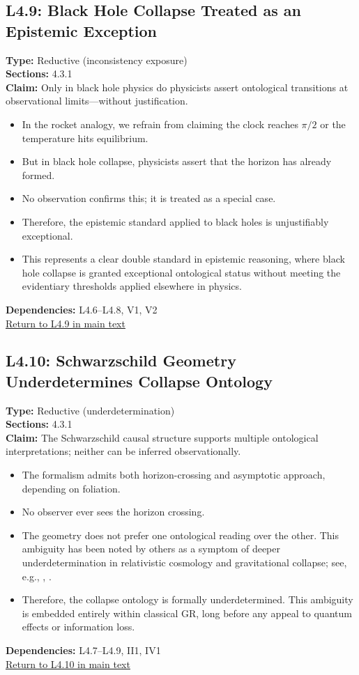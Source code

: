 \documentclass[12pt]{book}
\newcommand{\returnlink}[1]{\hyperref[logic:#1]{Return to #1 in main text}\xspace}
\begin{document}
\subsection*{L4.9: Black Hole Collapse Treated as an Epistemic Exception}\label{appendix:L4.9}
\textbf{Type:} Reductive (inconsistency exposure) \\
\textbf{Sections:} 4.3.1 \\
\textbf{Claim:} Only in black hole physics do physicists assert ontological transitions at observational limits---without justification.
\begin{itemize}
  \item In the rocket analogy, we refrain from claiming the clock reaches \( \pi/2 \) or the temperature hits equilibrium.
  \item But in black hole collapse, physicists assert that the horizon has already formed.
  \item No observation confirms this; it is treated as a special case.
  \item Therefore, the epistemic standard applied to black holes is unjustifiably exceptional.
  \item This represents a clear double standard in epistemic reasoning, where black hole collapse is granted exceptional ontological status without meeting the evidentiary thresholds applied elsewhere in physics.
\end{itemize}
\textbf{Dependencies:} L4.6–L4.8, V1, V2 \\
\returnlink{L4.9}

\subsection*{L4.10: Schwarzschild Geometry Underdetermines Collapse Ontology}\label{appendix:L4.10}
\textbf{Type:} Reductive (underdetermination) \\
\textbf{Sections:} 4.3.1 \\
\textbf{Claim:} The Schwarzschild causal structure supports multiple ontological interpretations; neither can be inferred observationally.
\begin{itemize}
  \item The formalism admits both horizon-crossing and asymptotic approach, depending on foliation.
  \item No observer ever sees the horizon crossing.
  \item The geometry does not prefer one ontological reading over the other. This ambiguity has been noted by others as a symptom of deeper underdetermination in relativistic cosmology and gravitational collapse; see, e.g., \citet{Earman1995Collapse}, \citet{Norton1993Time}.
  \item Therefore, the collapse ontology is formally underdetermined. This ambiguity is embedded entirely within classical GR, long before any appeal to quantum effects or information loss.
\end{itemize}
\textbf{Dependencies:} L4.7–L4.9, II1, IV1 \\
\returnlink{L4.10}
\end{document}
